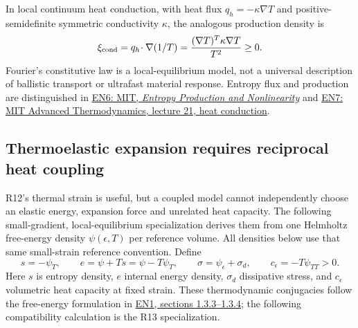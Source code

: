 In local continuum heat conduction, with heat flux $q_h=-\kappa\nabla T$
and positive-semidefinite symmetric conductivity $\kappa$, the analogous
production density is
\begin{equation}
 \xi_{\rm cond}=q_h\!\cdot\nabla(1/T)
          =\frac{(\nabla T)^T\kappa\nabla T}{T^2}\ge0.
 \label{eq:r13-fourier}
\end{equation}
Fourier's constitutive law is a local-equilibrium model, not a universal
description of ballistic transport or ultrafast material response. Entropy
flux and production are distinguished in
\href{https://live.ocw.mit.edu/courses/2-141-modeling-and-simulation-of-dynamic-systems-fall-2006/19a8fbec0c3f9d83e01f6d6fe759bcc1_entropy_producti.pdf}
{EN6: MIT, \emph{Entropy Production and Nonlinearity}} and
\href{https://ocw.mit.edu/courses/2-43-advanced-thermodynamics-spring-2024/1hMAkYNBhBaLcLpX6vPnQgR65rSvPUs5c_transcript.pdf}
{EN7: MIT Advanced Thermodynamics, lecture 21, heat conduction}.

\subsection{Thermoelastic expansion requires reciprocal heat coupling}
R12's thermal strain is useful, but a coupled model cannot independently
choose an elastic energy, expansion force and unrelated heat capacity.
The following small-gradient, local-equilibrium specialization derives them
from one Helmholtz free-energy density $\psi(\epsilon,T)$ per reference volume.
All densities below use that same small-strain reference convention. Define
\begin{equation}
 s=-\psi_T,\qquad e=\psi+Ts=\psi-T\psi_T,\qquad
 \sigma=\psi_\epsilon+\sigma_d,\qquad
 c_\epsilon=-T\psi_{TT}>0.
 \label{eq:r13-free-energy}
\end{equation}
Here $s$ is entropy density, $e$ internal energy density, $\sigma_d$ dissipative
stress, and $c_\epsilon$ volumetric heat capacity at fixed strain.
These thermodynamic conjugacies follow the free-energy formulation in
\href{https://www.eng.utah.edu/~banerjee/Notes/ThermoElastic.pdf}
{EN1, sections 1.3.3--1.3.4}; the following compatibility calculation is
the R13 specialization.


